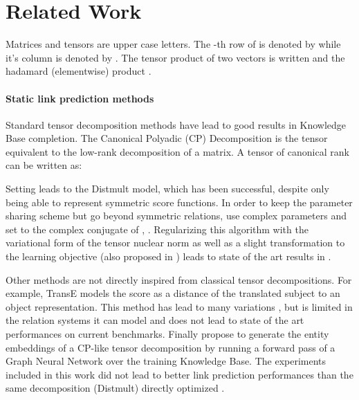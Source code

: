 \documentclass{article}
\begin{document}
\section{Related Work}
Matrices and tensors are upper case letters. The -th row of  is denoted by  while it's  column is denoted by . The tensor product of two vectors is written  and the hadamard (elementwise) product .

\paragraph{Static link prediction methods}
Standard tensor decomposition methods have lead to good results \citep{yang_embedding_2014, trouillon_complex_2016, lacroix2018canonical, balavzevic2019tucker} in Knowledge Base completion. The Canonical Polyadic (CP) Decomposition \citep{hitchcock_expression_1927} is the tensor equivalent to the low-rank decomposition of a matrix. A tensor  of canonical rank  can be written as:

Setting  leads to the Distmult \citep{yang_embedding_2014} model, which has been successful, despite only being able to represent symmetric score functions. In order to keep the parameter sharing scheme but go beyond symmetric relations, \citet{trouillon_complex_2016} use complex parameters and set  to the complex conjugate of , . Regularizing this algorithm with the variational form of the tensor nuclear norm as well as a slight transformation to the learning objective (also proposed in \citet{kazemi2018simple}) leads to state of the art results in \citet{lacroix2018canonical}. 



Other methods are not directly inspired from classical tensor decompositions. For example, TransE \citep{bordes_translating_2013} models the score as a distance of the translated subject to an object representation. This method has lead to many variations \citep{ji2015knowledge, nguyen2016stranse, wang2014knowledge}, but is limited in the relation systems it can model \citep{kazemi2018simple} and does not lead to state of the art performances on current benchmarks. Finally \citet{schlichtkrull2018modeling} propose to generate the entity embeddings of a CP-like tensor decomposition by running a forward pass of a Graph Neural Network over the training Knowledge Base. The experiments included in this work did not lead to better link prediction performances than the same decomposition (Distmult) directly optimized \citep{kadlec_knowledge_2017}.
\end{document}
